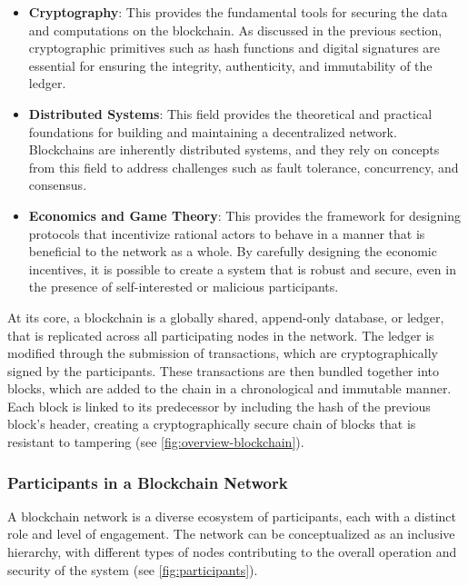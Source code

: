 \begin{itemize}
	\tightlist
	\item
	\textbf{Cryptography}: This provides the fundamental tools for
	securing the data and computations on the blockchain. As discussed in
	the previous section, cryptographic primitives such as hash functions
	and digital signatures are essential for ensuring the integrity,
	authenticity, and immutability of the ledger.
	\item
	\textbf{Distributed Systems}: This field provides the theoretical and
	practical foundations for building and maintaining a decentralized
	network. Blockchains are inherently distributed systems, and they rely
	on concepts from this field to address challenges such as fault
	tolerance, concurrency, and consensus.
	\item
	\textbf{Economics and Game Theory}: This provides the framework for
	designing protocols that incentivize rational actors to behave in a
	manner that is beneficial to the network as a whole. By carefully
	designing the economic incentives, it is possible to create a system
	that is robust and secure, even in the presence of self-interested or
	malicious participants.
\end{itemize}

At its core, a blockchain is a globally shared, append-only database, or
ledger, that is replicated across all participating nodes in the
network. The ledger is modified through the submission of transactions,
which are cryptographically signed by the participants. These
transactions are then bundled together into blocks, which are added to
the chain in a chronological and immutable manner. Each block is linked
to its predecessor by including the hash of the previous block's header,
creating a cryptographically secure chain of blocks that is resistant to
tampering (see \autoref{fig:overview-blockchain}).




\subsubsection{Participants in a Blockchain
	Network}\label{sec:participants-in-a-blockchain-network}

A blockchain network is a diverse ecosystem of participants, each with a
distinct role and level of engagement. The network can be conceptualized
as an inclusive hierarchy, with different types of nodes contributing to
the overall operation and security of the system (see \autoref{fig:participants}).

